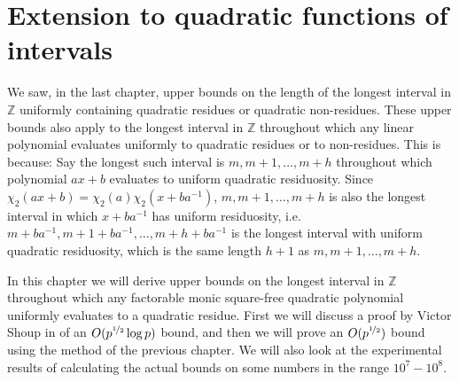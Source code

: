 \documentclass{report}
\begin{document}
\chapter{Extension to quadratic functions of intervals}


We saw, in the last chapter, upper bounds on the length of the longest interval in $\mathbb{Z}$ uniformly containing quadratic residues or quadratic non-residues. These upper bounds also apply to the longest interval in $\mathbb{Z}$ throughout which any linear polynomial evaluates uniformly to quadratic residues or to non-residues. This is because: Say the longest such interval is $m, m+1,\ldots,m+h$ throughout which polynomial $ax+b$ evaluates to uniform quadratic residuosity. Since $\chi_2(ax+b)=\chi_2(a)\chi_2(x+ba^{-1})$, $m, m+1,\ldots,m+h$ is also the longest interval in which $x+ba^{-1}$ has uniform residuosity, i.e. $m+ba^{-1}, m+1+ba^{-1},\ldots,m+h+ba^{-1}$ is the longest interval with uniform quadratic residuosity, which is the same length $h+1$ as $m, m+1,\ldots,m+h$.

In this chapter we will derive upper bounds on the longest interval in $\mathbb{Z}$ throughout which any factorable monic square-free quadratic polynomial uniformly evaluates to a quadratic residue. First we will discuss a proof by Victor Shoup in \cite{shoup} of an $O(p^{\nicefrac{1}{2}}\log p)$ bound, and then we will prove an $O(p^ {\nicefrac {1}{2}})$ bound using the method of the previous chapter. We will also look at the experimental results of calculating the actual bounds on some numbers in the range $10^{7}-10^{8}$.
%
%
\end{document}
